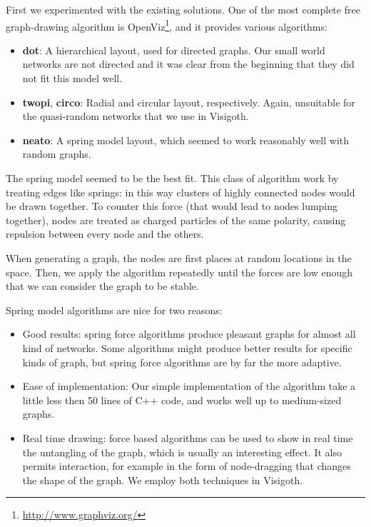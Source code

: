 \documentclass[a4paper,11pt,titlepage]{article}
\begin{document}
First we experimented with the existing solutions. One of the most complete free
graph-drawing algorithm is OpenViz\footnote{\url{http://www.graphviz.org/}}, and it
provides various algorithms:

\begin{itemize}
\item
  \textbf{dot}: A hierarchical layout, used for directed graphs. Our small world networks
  are not directed and it was clear from the beginning that they did not fit this model
  well.

\item
  \textbf{twopi}, \textbf{circo}: Radial and circular layout, respectively. Again,
  unsuitable for the quasi-random networks that we use in Visigoth.

\item
  \textbf{neato}: A spring model layout, which seemed to work reasonably well with random
  graphs.
\end{itemize}

The spring model seemed to be the best fit. This class of algorithm work by treating edges
like springs: in this way clusters of highly connected nodes would be drawn together. To
counter this force (that would lead to nodes lumping together), nodes are treated as
charged particles of the same polarity, causing repulsion between every node and the
others.

When generating a graph, the nodes are first places at random locations in the
space. Then, we apply the algorithm repeatedly until the forces are low enough that we can
consider the graph to be stable.

Spring model algorithms are nice for two reasons:

\begin{itemize}
\item
  Good results: spring force algorithms produce pleasant graphs for almost all kind of
  networks. Some algorithms might produce better results for specific kinds of graph, but
  spring force algorithms are by far the more adaptive.

\item
  Ease of implementation: Our simple implementation of the algorithm take a little less
  then 50 lines of C++ code, and works well up to medium-sized graphs.

\item
  Real time drawing: force based algorithms can be used to show in real time the
  untangling of the graph, which is usually an interesting effect. It also permits
  interaction, for example in the form of node-dragging that changes the shape of the
  graph. We employ both techniques in Visigoth.

\end{itemize}
\end{document}
